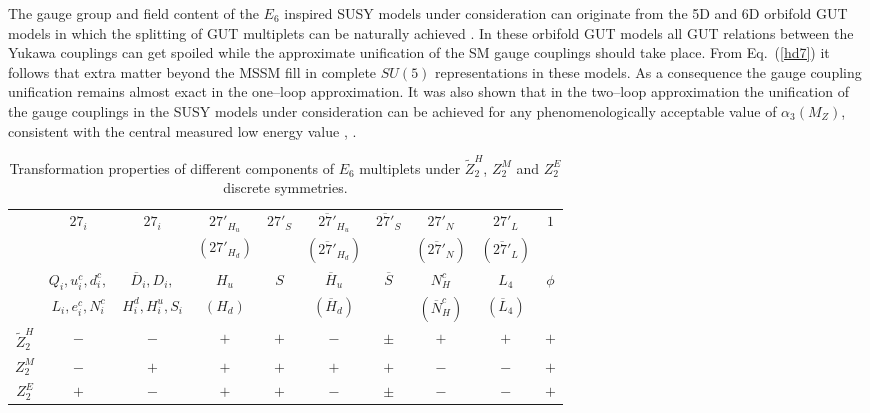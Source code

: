 \documentclass[12pt,a4paper]{article}
\begin{document}
The gauge group and field content of the $E_6$ inspired SUSY models under consideration
can originate from the 5D and 6D orbifold GUT models in which the splitting of GUT
multiplets can be naturally achieved \cite{nevzorov}. In these orbifold GUT models
all GUT relations between the Yukawa couplings can get spoiled while the approximate
unification of the SM gauge couplings should take place. From Eq.~(\ref{hd7}) it follows
that extra matter beyond the MSSM fill in complete $SU(5)$ representations in these
models. As a consequence the gauge coupling unification remains almost exact in the
one--loop approximation. It was also shown that in the two--loop approximation the unification
of the gauge couplings in the SUSY models under consideration can be achieved for any
phenomenologically acceptable value of $\alpha_3(M_Z)$, consistent with the central
measured low energy value \cite{nevzorov}, \cite{King:2007uj}.

\begin{table}[ht]
\centering
\begin{tabular}{|c|c|c|c|c|c|c|c|c|c|}
\hline
                   &  $27_i$          &   $27_i$              &$27'_{H_u}$&$27'_{S}$&
$\overline{27'}_{H_u}$&$\overline{27'}_{S}$&$27'_N$&$27'_{L}$&$1$\\
& & &$(27'_{H_d})$& &$(\overline{27'}_{H_d})$& &$(\overline{27'}_N)$&$(\overline{27'}_L)$&\\
\hline
                   &$Q_i,u^c_i,d^c_i,$&$\overline{D}_i,D_i,$  & $H_u$     & $S$     &
$\overline{H}_u$&$\overline{S}$&$N^c_H$&$L_4$&$\phi$\\
                   &$L_i,e^c_i,N^c_i$ &  $H^d_{i},H^u_{i},S_i$& $(H_d)$   &         &
$(\overline{H}_d)$&&$(\overline{N}_H^c)$&$(\overline{L}_4)$&\\
\hline
$\tilde{Z}^{H}_2$  & $-$              & $-$                   & $+$       & $+$     &
$-$&$\pm$&$+$&$+$&$+$\\
\hline
$Z_{2}^{M}$        & $-$              & $+$                   & $+$       & $+$     &
$+$&$+$&$-$&$-$&$+$\\
\hline
$Z_{2}^{E}$        & $+$              & $-$                   & $+$       & $+$     &
$-$&$\pm$&$-$&$-$&$+$\\
\hline
\end{tabular}
\caption{Transformation properties of different components of $E_6$ multiplets
under $\tilde{Z}^H_2$, $Z_{2}^{M}$ and $Z_{2}^{E}$ discrete symmetries.}
\label{tab-hd1}
\end{table}
\end{document}
